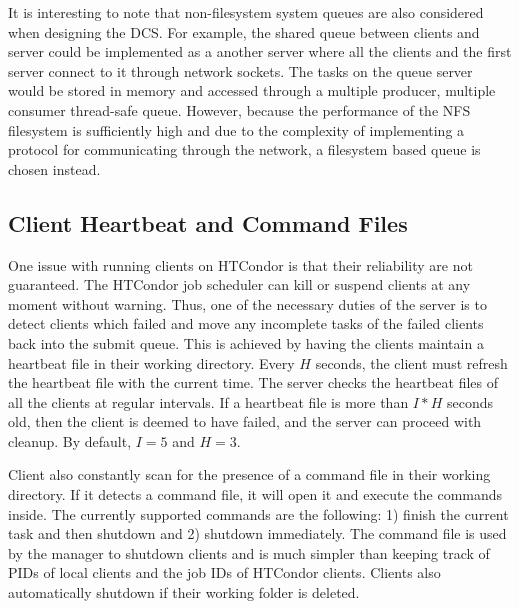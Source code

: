 \documentclass{article}
\begin{document}
It is interesting to note that non-filesystem system queues are also considered when designing the DCS. For example, the shared queue between clients and server could be implemented as a another server where all the clients and the first server connect to it through network sockets. The tasks on the queue server would be stored in memory and accessed through a multiple producer, multiple consumer thread-safe queue. However, because the performance of the NFS filesystem is sufficiently high and due to the complexity of implementing a protocol for communicating through the network, a filesystem based queue is chosen instead.

\subsection{Client Heartbeat and Command Files}

One issue with running clients on HTCondor is that their reliability are not guaranteed. The HTCondor job scheduler can kill or suspend clients at any moment without warning. Thus, one of the necessary duties of the server is to detect clients which failed and move any incomplete tasks of the failed clients back into the submit queue. This is achieved by having the clients maintain a heartbeat file in their working directory. Every $H$ seconds, the client must refresh the heartbeat file with the current time. The server checks the heartbeat files of all the clients at regular intervals. If a heartbeat file is more than $I * H$ seconds old, then the client is deemed to have failed, and the server can proceed with cleanup. By default, $I=5$ and $H=3$.

Client also constantly scan for the presence of a command file in their working directory. If it detects a command file, it will open it and execute the commands inside. The currently supported commands are the following: 1) finish the current task and then shutdown and 2) shutdown immediately. The command file is used by the manager to shutdown clients and is much simpler than keeping track of PIDs of local clients and the job IDs of HTCondor clients. Clients also automatically shutdown if their working folder is deleted.
\end{document}
